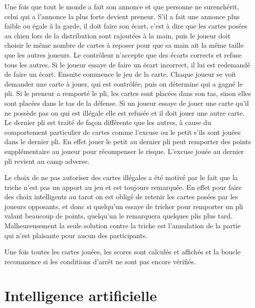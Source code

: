 \documentclass[a4paper]{report}
\begin{document}
			Une fois que tout le monde a fait son annonce et que personne ne surenchérit, celui qui a l'annonce la plus forte devient preneur. S'il a fait une annonce plus faible ou égale à 				la garde, il doit faire son écart, c’est à dire que les cartes posées au chien lors de la distribution sont rajoutées à la main, puis le joueur doit choisir le même nombre de 				cartes à reposer pour que sa main ait la même taille que les autres joueurs.
			Le contrôleur n’accepte que des écarts corrects et refuse tous les autres. Si le joueur essaye de faire un écart incorrect, il lui est redemandé de faire un écart.
			Ensuite commence le jeu de la carte. Chaque joueur se voit demander une carte à jouer, qui est contrôlée, puis on détermine qui a gagné le pli. Si le preneur a remporté le pli, les 				cartes sont placées dans son tas, sinon elles sont placées dans le tas de la défense. Si un joueur essaye de jouer une carte qu’il ne possède pas ou qui est illégale elle est 				refusée et il doit jouer une autre carte.
			Le dernier pli est traité de façon différente que les autres, à cause du comportement particulier de cartes comme l’excuse ou le petit s'ils sont jouées dans le dernier 			pli. En effet jouer le petit au dernier pli peut remporter des points supplémentaire au joueur pour récompenser le risque. L’excuse jouée au dernier pli revient au camp adverse.

			Le choix de ne pas autoriser des cartes illégales a été motivé par le fait que la triche n’est pas un apport au jeu et est toujours remarquée. En effet pour faire des choix 				intelligents au tarot on est obligé de retenir les cartes posées par les joueurs opposants, et donc si quelqu’un essaye de tricher pour remporter un pli valant beaucoup de 				points, quelqu’un le remarquera quelques plis plus tard. Malheureusement la seule solution contre la triche est l’annulation de la partie qui n’est plaisante pour aucun des 				participants.

			Une fois toutes les cartes jouées, les scores sont calculés et affichés et la boucle recommence si les conditions d'arrêt ne sont pas encore vérifiés.
	\section{Intelligence artificielle}
\end{document}
